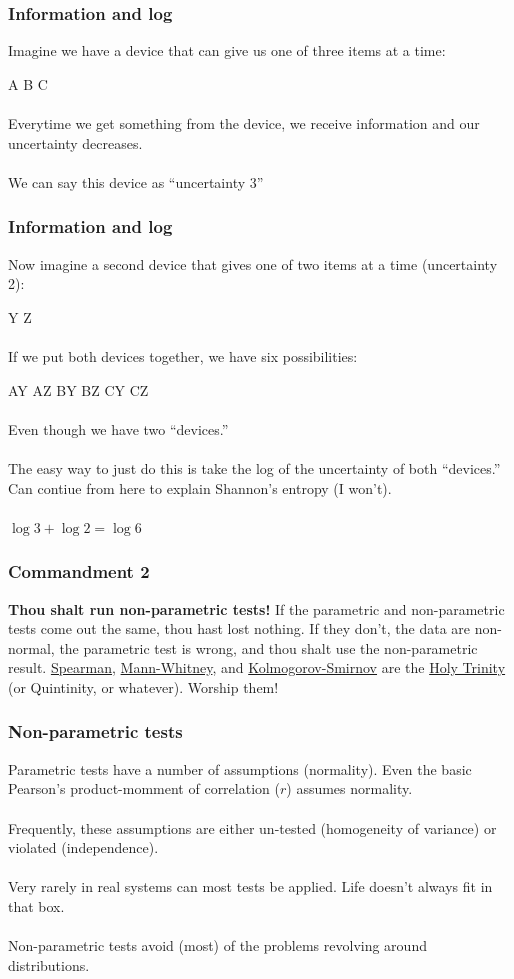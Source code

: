 \documentclass{beamer}\usepackage{graphicx, color}
\begin{document}
\begin{frame}
\frametitle{Information and log}
Imagine we have a device that can give us one of three items at a time: 

A B C
\\~\\
Everytime we get something from the device, we receive information and our uncertainty decreases.
\\~\\
We can say this device as ``uncertainty 3''
\end{frame}


\begin{frame}
\frametitle{Information and log}
Now imagine a second device that gives one of two items at a time (uncertainty 2): 

Y Z
\\~\\
If we put both devices together, we have six possibilities:

AY AZ BY BZ CY CZ
\\~\\
Even though we have two ``devices.''
\\~\\
The easy way to just do this is take the log of the uncertainty of both ``devices.'' Can contiue from here to explain Shannon's entropy (I won't).
\\~\\
\(\log 3 + \log 2 = \log 6\)
\end{frame}


\begin{frame}
\frametitle{Commandment 2}
\textbf{Thou shalt run non-parametric tests! }
If the parametric and non-parametric tests come out the same, thou hast lost nothing. 
If they don't, the data are non-normal, the parametric test is wrong, and thou shalt use the non-parametric result. 
\underline{Spearman}, \underline{Mann-Whitney}, and \underline{Kolmogorov-Smirnov} are the \underline{Holy Trinity} (or Quintinity, or whatever). 
Worship them!
\end{frame}


\begin{frame}
\frametitle{Non-parametric tests}
Parametric tests have a number of assumptions (normality).
Even the basic Pearson's product-momment of correlation (\(r\)) assumes normality.
\\~\\
Frequently, these assumptions are either un-tested (homogeneity of variance)
or violated (independence).
\\~\\
Very rarely in real systems can most tests be applied. 
Life doesn't always fit in that box.
\\~\\
Non-parametric tests avoid (most) of the problems revolving around distributions.
\end{frame}
\end{document}
